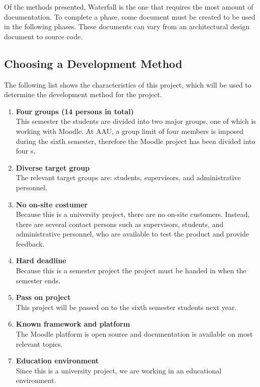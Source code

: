 Of the methods presented, Waterfall is the one that requires the most amount of documentation.
To complete a phase, some document must be created to be used in the following phases.
These documents can vary from an architectural design document to source code.

\subsection{Choosing a Development Method}
\label{subsec:choosingmethod}
The following list shows the characteristics of this project, which will be used to determine the development method for the project.
\begin{enumerate}
	\item \textbf{Four groups (14 persons in total)} \label{enum:groupSize}\\
	This semester the students are divided into two major groups, one of which is working with Moodle. 
	At AAU, a group limit of four members is imposed during the sixth semester, therefore the Moodle project has been divided into four \subgroup{}s.
	\item \textbf{Diverse target group} \label{enum:targetGroup}\\
	The relevant target groups are: students, supervisors, and administrative personnel.
	\item \textbf{No on-site costumer} \label{enum:onsite}\\
	Because this is a university project, there are no on-site customers. 
	Instead, there are several contact persons such as supervisors, students, and administrative personnel, who are available to test the product and provide feedback.
	\item \textbf{Hard deadline} \label{enum:deadline}\\
	Because this is a semester project the project must be handed in when the semester ends.
	\item \textbf{Pass on project} \label{enum:passed}\\
	This project will be passed on to the sixth semester students next year.
	\item \textbf{Known framework and platform} \label{enum:framework}\\
	The Moodle platform is open source and documentation is available on most relevant topics.
	\item \textbf{Education environment} \label{enum:education}\\
	Since this is a university project, we are working in an educational environment.

\end{enumerate}
